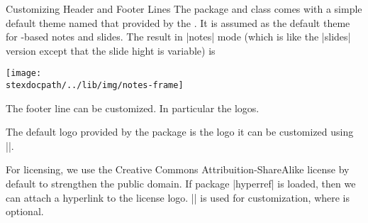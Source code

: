 \begin{sfragment}{Customizing Header and Footer Lines}
  The  package and class comes with a simple default theme named
   that provided by the . It is assumed as the default
  theme for \sTeX-based notes and slides.
  The result in |notes| mode (which is like the |slides| version except that the slide
  hight is variable) is
  
  \texttt{[image: \\stexdocpath/../lib/img/notes-frame]}
  
The footer line can be customized. In particular the logos. 

\begin{function} {\setslidelogo}
  The default logo provided by the  package is the {\sTeX} logo it can be
  customized using ||.
\end{function}


\begin{function}{\setlicensing}
  For licensing, we use the Creative Commons Attribuition-ShareAlike license by default to
  strengthen the public domain. If package |hyperref| is loaded, then we can attach a
  hyperlink to the license logo. || is used
  for customization, where  is optional.
\end{function}
\end{sfragment}

